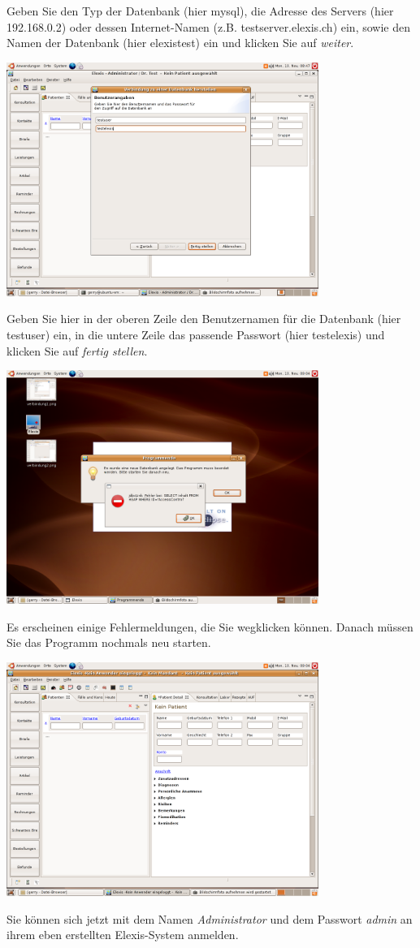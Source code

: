 Geben Sie den Typ der Datenbank (hier mysql), die Adresse des Servers (hier 192.168.0.2) oder dessen Internet-Namen (z.B. testserver.elexis.ch) ein, sowie den Namen der Datenbank (hier  elexistest) ein und klicken Sie auf \textit{weiter}.

\includegraphics[width=4in]{images/verbindung2.png}

Geben Sie hier in der oberen Zeile den Benutzernamen für die Datenbank (hier testuser) ein, in die untere Zeile das passende Passwort (hier testelexis) und klicken Sie auf \textit{fertig stellen}.

\includegraphics[width=4in]{images/verbindung3.png}

Es erscheinen einige Fehlermeldungen, die Sie wegklicken können. Danach müssen Sie das Programm nochmals neu starten.

\includegraphics[width=4in]{images/verbindung4.png}


 Sie können sich jetzt mit dem Namen \textit{Administrator} und dem Passwort \textit{admin} an ihrem eben erstellten Elexis-System anmelden. 